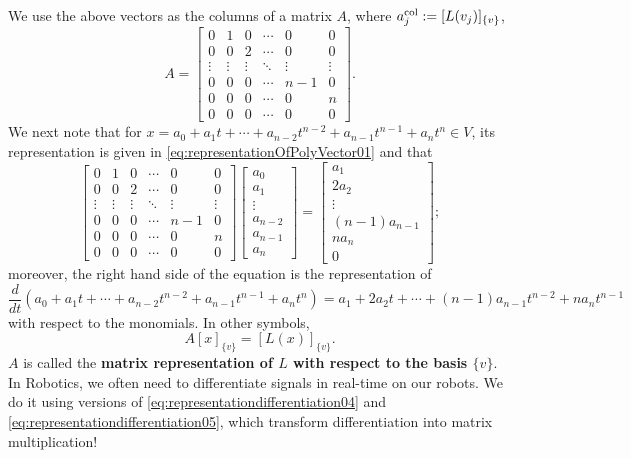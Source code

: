  We use the above vectors as the columns of a matrix $A$, where $a_j^{\rm col}:=[L(v_j)]_{\{v\}}$,
   \begin{equation}
     \label{eq:representationdifferentiation03}
 A = \left[
\begin{array}{cccccc}
0 & 1 & 0& \cdots & 0 & 0 \\
0 & 0 & 2& \cdots & 0 & 0 \\
\vdots & \vdots & \vdots& \ddots & \vdots & \vdots \\
0 & 0 & 0& \cdots & n-1 & 0 \\
0 & 0 & 0& \cdots & 0 & n \\
0 & 0 & 0& \cdots & 0 & 0 
\end{array}
\right].
\end{equation}
We next note that for $x=a_0 + a_1 t +  \cdots +a_{n-2} t^{n-2} +a_{n-1} t^{n-1} + a_n t^n\in V$, its representation is given in \eqref{eq:representationOfPolyVector01} and that
  \begin{equation}
     \label{eq:representationdifferentiation04}
\left[
\begin{array}{cccccc}
0 & 1 & 0& \cdots & 0 & 0 \\
0 & 0 & 2& \cdots & 0 & 0 \\
\vdots & \vdots & \vdots& \ddots & \vdots & \vdots \\
0 & 0 & 0& \cdots & n-1 & 0 \\
0 & 0 & 0& \cdots & 0 & n \\
0 & 0 & 0& \cdots & 0 & 0 
\end{array}
\right] \left[ \begin{array}{c}
a_0 \\ a_1 \\ \vdots\\ a_{n-2} \\ a_{n-1}  \\ a_n
\end{array}\right] =  \left[ \begin{array}{c}
a_1 \\ 2 a_2 \\  \vdots\\ (n-1) a_{n-1}  \\ n a_n\\ 0
\end{array}\right];
\end{equation}
moreover,  the right hand side of the equation is the representation of 
$$\frac{d}{dt}\left( a_0 + a_1 t +  \cdots +a_{n-2} t^{n-2} +a_{n-1} t^{n-1} + a_n t^n\right) =   a_1  + 2 a_2 t +  \cdots  +(n-1)a_{n-1} t^{n-2} + n a_n t^{n-1}$$
with respect to the monomials. In other symbols, 
 \begin{equation}
     \label{eq:representationdifferentiation05}
    A \left[ x \right]_{\{ v\}} =  [ L(x)]_{\{v\}}. 
 \end{equation}
 $A$ is called the \textbf{matrix representation of $L$ with respect to the basis $\{v\}$}. In Robotics, we often need to differentiate signals in real-time on our robots. We do it using versions of \eqref{eq:representationdifferentiation04} and \eqref{eq:representationdifferentiation05}, which transform differentiation into matrix multiplication!



